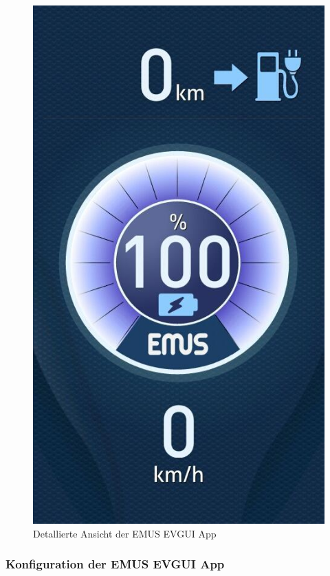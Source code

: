\begin{figure}[H]
	\begin{center}
		\includegraphics[scale=0.5]{figures/Akku/EMUSAPP2.jpg}
		\caption{Detallierte Ansicht der EMUS EVGUI App}
	\end{center}
\end{figure}

\subsubsection{Konfiguration der EMUS EVGUI App}

